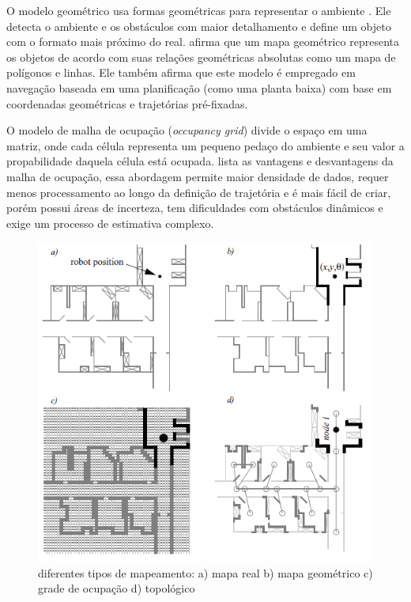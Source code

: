 O modelo geométrico usa formas geométricas para representar o ambiente \cite{Choset2005}. Ele detecta o ambiente e os obstáculos com maior detalhamento e define um objeto com o formato mais próximo do real. \cite{Secchi2008} afirma que um mapa geométrico representa os objetos de acordo com suas relações geométricas absolutas como um mapa de polígonos e linhas. Ele também afirma que este modelo é empregado em navegação baseada em uma planificação (como uma planta baixa) com base em coordenadas geométricas e trajetórias pré-fixadas. 

O modelo de malha de ocupação (\textit{occupancy grid}) divide o espaço em uma matriz, onde cada célula representa um pequeno pedaço do ambiente e seu valor a propabilidade daquela célula está ocupada. \cite{Borenstein1996} lista as vantagens e desvantagens da malha de ocupação, essa abordagem permite maior densidade de dados, requer menos processamento ao longo da definição de trajetória e é mais fácil de criar, porém possui áreas de incerteza, tem dificuldades com obstáculos dinâmicos e exige um processo de estimativa complexo.

\begin{figure}[h]
	\centering
	\label{fig06}
		\includegraphics[keepaspectratio=true,scale=0.6]{figuras/mapas.png}
	\caption{diferentes tipos de mapeamento: a) mapa real b) mapa geométrico c) grade de ocupação d) topológico \cite{Siegwart2004}}
\end{figure}

